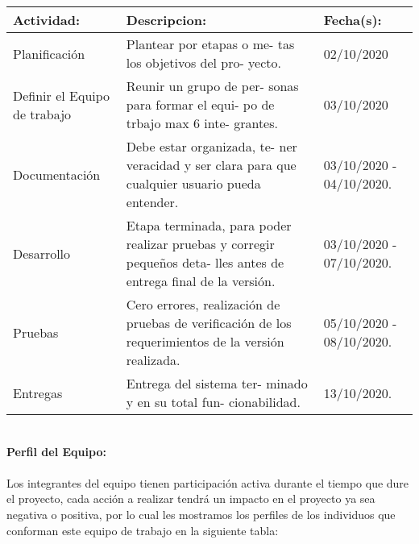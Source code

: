 \documentclass[40pt]{article}
\begin{document}
\vspace{0.5 cm}
\begin{table}[h!]
\begin{tabular}{|p{4.5 cm}|p{4 cm}|p{4 cm}|}
\hline
\textbf{Actividad:}&\textbf{Descripcion:}&\textbf{Fecha(s):}
\\\hline
Planificación & Plantear por etapas o me- tas los objetivos del pro- yecto. & 02/10/2020 \\\hline
Definir el Equipo de trabajo & Reunir un grupo de per- sonas para formar el equi- po de trbajo max 6 inte- grantes. & 03/10/2020 \\\hline
Documentación & Debe estar organizada, te- ner veracidad y ser clara para que cualquier usuario pueda entender.  & 03/10/2020 - 04/10/2020. \\\hline
Desarrollo & Etapa terminada, para poder realizar pruebas y corregir pequeños deta- lles antes de entrega final de la versión. & 03/10/2020 - 07/10/2020. \\\hline
Pruebas & Cero errores, realización de pruebas de verificación de los requerimientos de la versión realizada. & 05/10/2020 - 08/10/2020. \\\hline
Entregas & Entrega del sistema ter- minado y en su total fun- cionabilidad. & 13/10/2020.\\\hline
\end{tabular}
\end{table}

\maketitle
\textsf{\ \\
\textbf{Perfil del Equipo:}\\
\\
Los integrantes del equipo tienen participación activa durante el tiempo que dure el proyecto, cada acción a realizar tendrá un impacto en el proyecto ya sea negativa o positiva, por lo cual les mostramos los perfiles de los individuos que conforman este equipo de trabajo en la siguiente tabla: \\}
\end{document}
